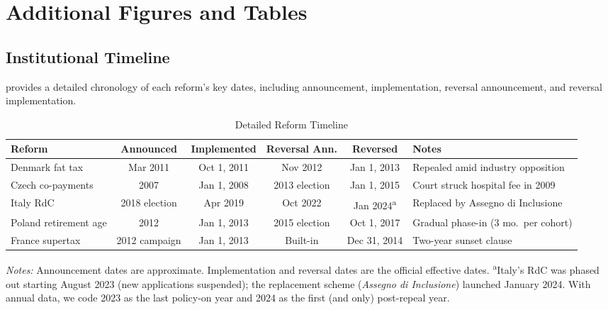 \documentclass[12pt]{article}
\begin{document}
\section{Additional Figures and Tables}
\label{app:additional}

\subsection{Institutional Timeline}

 provides a detailed chronology of each reform's key dates, including announcement, implementation, reversal announcement, and reversal implementation.

\begin{table}[H]
\centering
\caption{Detailed Reform Timeline}
\label{tab:timeline}
\begin{adjustbox}{max width=\textwidth}
\begin{tabular}{lccccl}
\toprule
Reform & Announced & Implemented & Reversal Ann. & Reversed & Notes \\
\midrule
Denmark fat tax & Mar 2011 & Oct 1, 2011 & Nov 2012 & Jan 1, 2013 & Repealed amid industry opposition \\
Czech co-payments & 2007 & Jan 1, 2008 & 2013 election & Jan 1, 2015 & Court struck hospital fee in 2009 \\
Italy RdC & 2018 election & Apr 2019 & Oct 2022 & Jan 2024\textsuperscript{a} & Replaced by Assegno di Inclusione \\
Poland retirement age & 2012 & Jan 1, 2013 & 2015 election & Oct 1, 2017 & Gradual phase-in (3 mo.\ per cohort) \\
France supertax & 2012 campaign & Jan 1, 2013 & Built-in & Dec 31, 2014 & Two-year sunset clause \\
\bottomrule
\end{tabular}
\end{adjustbox}
\par\vspace{0.3em}
{\small \textit{Notes:} Announcement dates are approximate. Implementation and reversal dates are the official effective dates. \textsuperscript{a}Italy's RdC was phased out starting August 2023 (new applications suspended); the replacement scheme (\textit{Assegno di Inclusione}) launched January 2024. With annual data, we code 2023 as the last policy-on year and 2024 as the first (and only) post-repeal year.}
\end{table}
\end{document}
